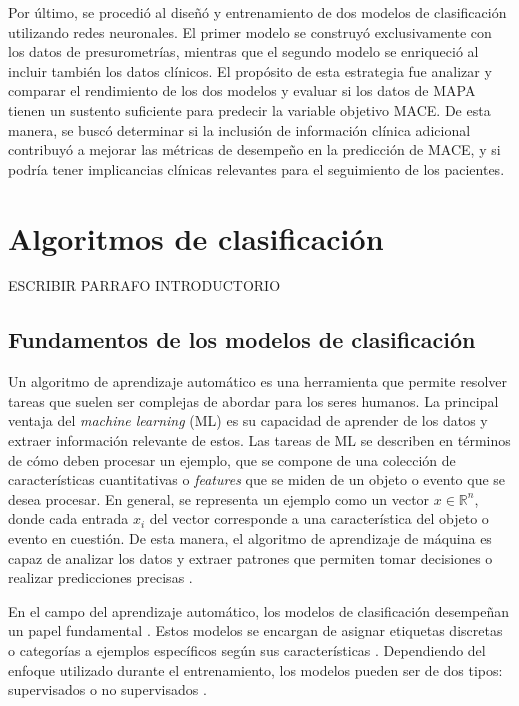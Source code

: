 Por último, se procedió al diseñó y entrenamiento de dos modelos de clasificación utilizando 
redes neuronales. El primer modelo se construyó exclusivamente con los datos de presurometrías, 
mientras que el segundo modelo se enriqueció al incluir también los datos clínicos. El propósito 
de esta estrategia fue analizar y comparar el rendimiento de los dos modelos y evaluar si los 
datos de MAPA tienen un sustento suficiente para predecir la variable objetivo MACE. De esta 
manera, se buscó determinar si la inclusión de información clínica adicional contribuyó a 
mejorar las métricas de desempeño en la predicción de MACE, y si podría tener implicancias 
clínicas relevantes para el seguimiento de los pacientes.

\section{Algoritmos de clasificación}
\label{sec:Algoritmos de clasificación}

ESCRIBIR PARRAFO INTRODUCTORIO

\subsection{Fundamentos de los modelos de clasificación}
Un algoritmo de aprendizaje automático es una herramienta que permite resolver tareas  
que suelen ser complejas de abordar para los seres humanos. La principal ventaja del \emph{machine 
learning} (ML) es su capacidad de aprender de los datos y extraer información relevante de 
estos. Las tareas de ML se describen en términos de cómo deben procesar un ejemplo, que se 
compone de una colección de características cuantitativas o \emph{features} que se miden de un objeto 
o evento que se desea procesar. En general, se representa un ejemplo como un vector $ x\in\mathbb{R}^n $,
donde cada entrada $x_{i}$ del vector corresponde a una característica del objeto 
o evento en cuestión. De esta manera, el algoritmo de aprendizaje de máquina es capaz de 
analizar los datos y extraer patrones que permiten tomar decisiones o realizar predicciones 
precisas \citep{CITE:35}.

En el campo del aprendizaje automático, los modelos de clasificación desempeñan un papel fundamental 
\citep{CITE:32}. Estos modelos se encargan de asignar etiquetas discretas o categorías a ejemplos 
específicos según sus características \citep{CITE:33}. Dependiendo del enfoque utilizado durante el 
entrenamiento, los modelos pueden ser de dos tipos: supervisados o no supervisados \citep{CITE:35}.

